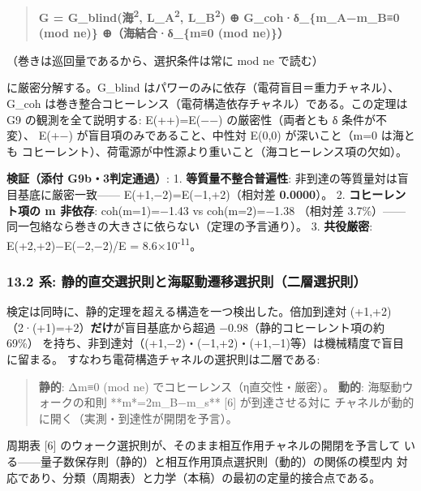 \documentclass[
]{ltjarticle}
\begin{document}
\begin{quote}
\textbf{G = G\_blind(\textbar 海\textbar{}\textsuperscript{2},
\textbar L\_A\textbar{}\textsuperscript{2},
\textbar L\_B\textbar{}\textsuperscript{2}) ⊕ G\_coh·δ\_\{m\_A−m\_B≡0
(mod ne)\} ⊕（海結合·δ\_\{m≡0 (mod ne)\}）}
\end{quote}

（巻きは巡回量であるから、選択条件は常に mod ne で読む）

に厳密分解する。G\_blind はパワーのみに依存（電荷盲目＝重力チャネル）、
G\_coh は巻き整合コヒーレンス（電荷構造依存チャネル）である。この定理は
G9 の観測を全て説明する: E(++)=E(−−) の厳密性（両者とも δ 条件が不変）、
E(+−) が盲目項のみであること、中性対 E(0,0) が深いこと（m=0 は海とも
コヒーレント）、荷電源が中性源より重いこと（海コヒーレンス項の欠如）。

\textbf{検証（添付 G9b・3判定通過）}: 1. \textbf{等質量不整合普遍性}:
非到達の等質量対は盲目基底に厳密一致------ E(+1,−2)=E(−1,+2)（相対差
\textbf{0.0000}）。 2. \textbf{コヒーレント項の \textbar m\textbar{}
非依存}: coh(m=1)=−1.43 vs coh(m=2)=−1.38 （相対差
3.7\%）------同一包絡なら巻きの大きさに依らない（定理の予言通り）。 3.
\textbf{共役厳密}:
\textbar E(+2,+2)−E(−2,−2)\textbar/\textbar E\textbar{} =
8.6×10\textsuperscript{-11}。

\subsubsection{13.2 系:
静的直交選択則と海駆動遷移選択則（二層選択則）}\label{ux7cfb-ux9759ux7684ux76f4ux4ea4ux9078ux629eux5247ux3068ux6d77ux99c6ux52d5ux9077ux79fbux9078ux629eux5247ux4e8cux5c64ux9078ux629eux5247}

検定は同時に、静的定理を超える構造を一つ検出した。倍加到達対 (+1,+2)
（2·(+1)=+2）\textbf{だけ}が盲目基底から超過
−0.98（静的コヒーレント項の約69\%）
を持ち、非到達対（(+1,−2)・(−1,+2)・(+1,−1)等）は機械精度で盲目に留まる。
すなわち電荷構造チャネルの選択則は二層である:

\begin{quote}
\textbf{静的}: Δm≡0 (mod ne) でコヒーレンス（η直交性・厳密）。
\textbf{動的}: 海駆動ウォークの和則 **m*=2m\_B−m\_s** {[}6{]}
が到達させる対に チャネルが動的に開く（実測・到達性が開閉を予言）。
\end{quote}

周期表 {[}6{]}
のウォーク選択則が、そのまま相互作用チャネルの開閉を予言して
いる------量子数保存則（静的）と相互作用頂点選択則（動的）の関係の模型内
対応であり、分類（周期表）と力学（本稿）の最初の定量的接合点である。
\end{document}
